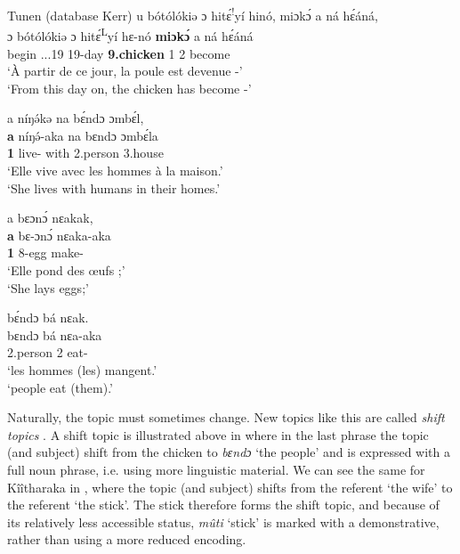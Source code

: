 \documentclass[output=paper]{langscibook}
\begin{document}
\ea
Tunen (database Kerr)
\label{bkm:Ref145315632}\label{bkm:Ref131685493}
\sn
u bótólókiə ɔ hitɛ́\textsuperscript{!}yí hinó, miɔkɔ́ a ná hɛ́áná,\\
\gll
ɔ	bótólókiə	ɔ	hitɛ́\textsuperscript{L}yí	hɛ-nó	\textbf{miɔkɔ́}	a	ná	hɛ́áná\\
\PREP{}  begin  \PREP{}  \DEM.\DISC{}.\EMPH{}.19  19-day  \textbf{9.chicken}  1\SM{}  \PST{}2  become\\
\glt
‘\`{A} partir de ce jour, la poule est devenue -’\\
‘From this day on, the chicken has become -’




\sn
a níŋə́kə na bɛ́ndɔ ɔmbɛ́l,\\
\gll
\textbf{a}  níŋə́-aka	na	bɛndɔ	ɔmbɛ́la\\
\textbf{1\SM{}}  live-\DUR{}  with  2.person  3.house\\
\glt
‘Elle vive avec les hommes à la maison.’\\
‘She lives with humans in their homes.’


\pagebreak

\sn
a bɛɔnɔ́ nɛakak,  \\
\gll
\textbf{a}  bɛ-ɔnɔ́	nɛaka-aka\\
\textbf{1\SM{}}  8-egg  make-\DUR{}\\
\glt
‘Elle pond des œufs ;’\\
‘She lays eggs;’




\sn
bɛ́ndɔ bá nɛak.\\
\gll
bɛndɔ  bá  nɛa-aka\\
2.person  2\SM{}  eat-\DUR{}\\
\glt
‘les hommes (les) mangent.’\\
‘people eat (them).’


\z

Naturally, the topic must sometimes change. New topics like this are called \textit{shift} \textit{topics} \citep{Erteschik-Shir2007}. A shift topic is illustrated above in  where in the last phrase the topic (and subject) shift from the chicken to \textit{bɛndɔ} ‘the people’ and is expressed with a full noun phrase, i.e. using more linguistic material. We can see the same for Kîîtharaka in , where the topic (and subject) shifts from the referent ‘the wife’ to the referent ‘the stick’. The stick therefore forms the shift topic, and because of its relatively less accessible status, \textit{mûti} ‘stick’ is marked with a demonstrative, rather than using a more reduced encoding.
\end{document}
